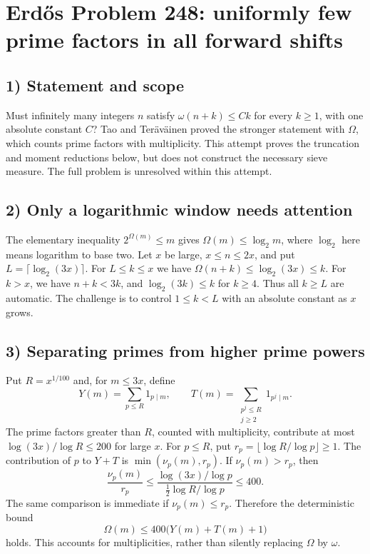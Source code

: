 \section{Erd\H{o}s Problem 248: uniformly few prime factors in all forward shifts}

\subsection{1) Statement and scope}
Must infinitely many integers $n$ satisfy
$\omega(n+k)\leq Ck$ for every $k\geq1$, with one absolute
constant $C$? Tao and Ter\"av\"ainen proved the stronger
statement with $\Omega$, which counts prime factors with
multiplicity. This attempt proves the truncation and moment
reductions below, but does not construct the necessary sieve
measure. The full problem is unresolved within this attempt.

\subsection{2) Only a logarithmic window needs attention}
The elementary inequality $2^{\Omega(m)}\leq m$ gives
$\Omega(m)\leq\log_2m$, where $\log_2$ here means logarithm
to base two. Let $x$ be large, $x\leq n\leq2x$, and put
$L=\lceil\log_2(3x)\rceil$.
For $L\leq k\leq x$ we have
$\Omega(n+k)\leq\log_2(3x)\leq k$.
For $k>x$, we have $n+k<3k$, and
$\log_2(3k)\leq k$ for $k\geq4$.
Thus all $k\geq L$ are automatic. The challenge is to control
$1\leq k<L$ with an absolute constant as $x$ grows.

\subsection{3) Separating primes from higher prime powers}
Put $R=x^{1/100}$ and, for $m\leq3x$, define
\[
 Y(m)=\sum_{p\leq R}1_{p\mid m},\qquad
 T(m)=\sum_{\substack{p^j\leq R\\j\geq2}}1_{p^j\mid m}.
\]
The prime factors greater than $R$, counted with multiplicity,
contribute at most $\log(3x)/\log R\leq200$ for large $x$.
For $p\leq R$, put $r_p=\lfloor\log R/\log p\rfloor\geq1$.
The contribution of $p$ to $Y+T$ is $\min(\nu_p(m),r_p)$.
If $\nu_p(m)>r_p$, then
\[
 \frac{\nu_p(m)}{r_p}
 \leq\frac{\log(3x)/\log p}
           {\tfrac12\log R/\log p}\leq400.
\]
The same comparison is immediate if $\nu_p(m)\leq r_p$.
Therefore the deterministic bound
\[
 \Omega(m)\leq400\bigl(Y(m)+T(m)+1\bigr)
\]
holds. This accounts for multiplicities, rather than silently
replacing $\Omega$ by $\omega$.

